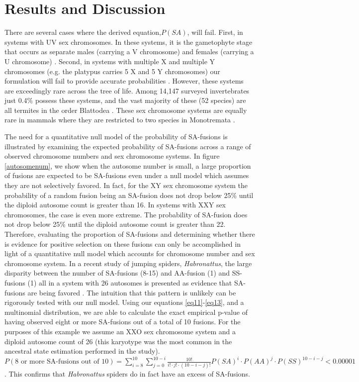 \documentclass[12pt]{article}
\begin{document}
\section{Results and Discussion}

There are several cases where the derived equation,$P(SA)$, will fail.
First, in systems with UV sex chromosomes. 
In these systems, it is the gametophyte stage that occurs as separate males (carrying a V chromosome) and females (carrying a U chromosome) \citep{bachtrog2014sex}.
Second, in systems with multiple X and multiple Y chromosomes (e.g. the platypus carries 5 X and 5 Y chromosomes) our formulation will fail to provide accurate probabilities \citep{hsu2013}.
However, these systems are exceedingly rare across the tree of life.
Among 14,147 surveyed invertebrates just 0.4\% possess these systems, and the vast majority of these (52 species) are all termites in the order Blattodea \citep{blackmon2017}. 
These sex chromosome systems are equally rare in mammals where they are restricted to two species in Monotremata \citep{ashman2014tree}.

The need for a quantitative null model of the probability of SA-fusions is illustrated by examining the expected probability of SA-fusions across a range of observed chromosome numbers and sex chromosome systems.
In figure \ref{autosomenum}, we show when the autosome number is small, a large proportion of fusions are expected to be SA-fusions even under a null model which assumes they are not selectively favored. 
In fact, for the XY sex chromosome system the probability of a random fusion being an SA-fusion does not drop below 25\% until the diploid autosome count is greater than 16. 
In systems with XXY sex chromosomes, the case is even more extreme. The probability of SA-fusion does not drop below 25\% until the diploid autosome count is greater than 22.
Therefore, evaluating the proportion of SA-fusions and determining whether there is evidence for positive selection on these fusions can only be accomplished in light of a quantitative null model which accounts for chromosome number and sex chromosome system.
In a recent study of jumping spiders, \textit{Habronattus}, the large disparity between the number of SA-fusions (8-15) and AA-fusion (1) and SS-fusions (1) all in a system with 26 autosomes is presented as evidence that SA-fusions are being favored \citep{maddison2013}. 
The intuition that this pattern is unlikely can be rigorously tested with our null model.
Using our equations \ref{eq11}-\ref{eq13}, and a multinomial distribution, we are able to calculate the exact empirical p-value of having observed eight or more SA-fusions out of a total of 10 fusions.
For the purposes of this example we assume an XXO sex chromosome system and a diploid autosome count of 26 (this karyotype was the most common in the ancestral state estimation performed in the study).
$P(8 \mbox{ or more SA-fusions out of } 10)= 
\sum\limits_{i=8}^{10} \sum\limits_{j=0}^{10-i} \frac{10!}{i! \cdot j! \cdot (10-i-j)!} P(SA)^i \cdot P(AA)^j \cdot P(SS)^{10-i-j} < 0.00001$. 
This confirms that \textit{Habronattus} spiders do in fact have an excess of SA-fusions.
\end{document}
